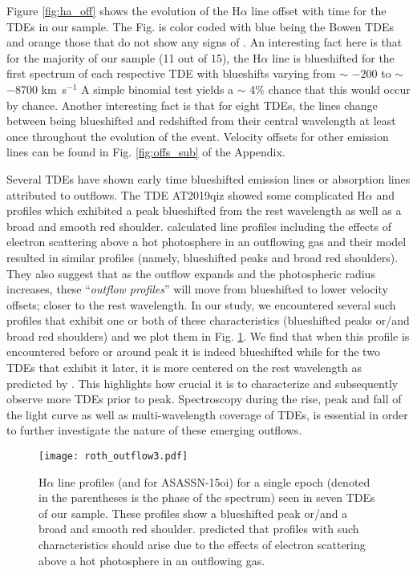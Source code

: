 \documentclass[structabstract]{aa}
\begin{document}
Figure \ref{fig:ha_off} shows the evolution of the H$\alpha$ line offset with time for the TDEs in our sample. The Fig. is color coded with blue being the Bowen  TDEs and orange those that do not show any signs of . An interesting fact here is that for the majority of our sample (11 out of 15), the H$\alpha$ line is blueshifted for the first spectrum of each respective TDE with blueshifts varying from $\sim$ $-$200 to $\sim$ $-$8700 km~s$^{-1}$
A simple binomial test yields a $\sim$ 4$\%$ chance that this would occur by chance. Another interesting fact is that for eight TDEs, the lines change between being blueshifted and redshifted from their central wavelength at least once throughout the evolution of the event. Velocity offsets for other emission lines %
can be found in Fig. \ref{fig:offs_sub} of the Appendix. 


Several TDEs have shown early time blueshifted emission lines \citep{Arcavi2014,Holoien2015,Nicholl2020} or absorption lines \citep{Hung2019} attributed to outflows. The TDE AT2019qiz \citep{Nicholl2020} showed some complicated H$\alpha$ and  profiles which exhibited a peak blueshifted from the rest wavelength as well as a broad and smooth red shoulder. \citet{Roth2017} calculated line profiles including the effects of electron scattering above a hot photosphere in an outflowing gas and their model resulted in similar profiles (namely, blueshifted peaks and broad red shoulders). They also suggest that as the outflow expands and the photospheric radius increases, these ``\textit{outflow profiles}'' will move from blueshifted to lower velocity offsets; closer to the rest wavelength. In our study, we encountered several such profiles that exhibit one or both of these characteristics (blueshifted peaks or/and broad red shoulders) and we plot them in Fig. \ref{fig:roth_out3}. We find that when this profile is encountered before or around peak it is indeed blueshifted while for the two TDEs that exhibit it later, it is more centered on the rest wavelength as predicted by \citealt{Roth2017}. This highlights how crucial it is to characterize and subsequently observe more TDEs prior to peak. Spectroscopy during the rise, peak and fall of the light curve as well as multi-wavelength coverage of TDEs, is essential in order to further investigate the nature of these emerging outflows.

\begin{figure}
\centering
\texttt{[image: roth\_outflow3.pdf]}
\caption{H$\alpha$ line profiles (and  for ASASSN-15oi) for a single epoch (denoted in the parentheses is the phase of the spectrum) seen in seven TDEs of our sample. These profiles show a blueshifted peak or/and a broad and smooth red shoulder. \citet{Roth2017} predicted that profiles with such characteristics should arise due to the effects of electron scattering above a hot photosphere in an outflowing gas.}
\label{fig:roth_out3}
\end{figure}
\end{document}
